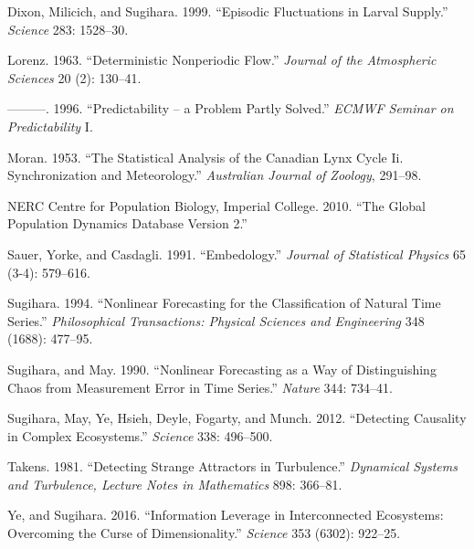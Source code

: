 \documentclass[]{article}
\begin{document}
\leavevmode\hypertarget{ref-Dixon_1999}{}%
Dixon, Milicich, and Sugihara. 1999. ``Episodic Fluctuations in Larval
Supply.'' \emph{Science} 283: 1528--30.

\leavevmode\hypertarget{ref-Lorenz_1963}{}%
Lorenz. 1963. ``Deterministic Nonperiodic Flow.'' \emph{Journal of the
Atmospheric Sciences} 20 (2): 130--41.

\leavevmode\hypertarget{ref-Lorenz_1996}{}%
---------. 1996. ``Predictability -- a Problem Partly Solved.''
\emph{ECMWF Seminar on Predictability} I.

\leavevmode\hypertarget{ref-Moran_1953}{}%
Moran. 1953. ``The Statistical Analysis of the Canadian Lynx Cycle Ii.
Synchronization and Meteorology.'' \emph{Australian Journal of Zoology},
291--98.

\leavevmode\hypertarget{ref-NERC-Centre-for-Population-Biology_2010}{}%
NERC Centre for Population Biology, Imperial College. 2010. ``The Global
Population Dynamics Database Version 2.''

\leavevmode\hypertarget{ref-Sauer_1991}{}%
Sauer, Yorke, and Casdagli. 1991. ``Embedology.'' \emph{Journal of
Statistical Physics} 65 (3-4): 579--616.

\leavevmode\hypertarget{ref-Sugihara_1994}{}%
Sugihara. 1994. ``Nonlinear Forecasting for the Classification of
Natural Time Series.'' \emph{Philosophical Transactions: Physical
Sciences and Engineering} 348 (1688): 477--95.

\leavevmode\hypertarget{ref-Sugihara_1990}{}%
Sugihara, and May. 1990. ``Nonlinear Forecasting as a Way of
Distinguishing Chaos from Measurement Error in Time Series.''
\emph{Nature} 344: 734--41.

\leavevmode\hypertarget{ref-Sugihara_2012}{}%
Sugihara, May, Ye, Hsieh, Deyle, Fogarty, and Munch. 2012. ``Detecting
Causality in Complex Ecosystems.'' \emph{Science} 338: 496--500.

\leavevmode\hypertarget{ref-Takens_1981}{}%
Takens. 1981. ``Detecting Strange Attractors in Turbulence.''
\emph{Dynamical Systems and Turbulence, Lecture Notes in Mathematics}
898: 366--81.

\leavevmode\hypertarget{ref-Ye_2016}{}%
Ye, and Sugihara. 2016. ``Information Leverage in Interconnected
Ecosystems: Overcoming the Curse of Dimensionality.'' \emph{Science} 353
(6302): 922--25.
\end{document}
